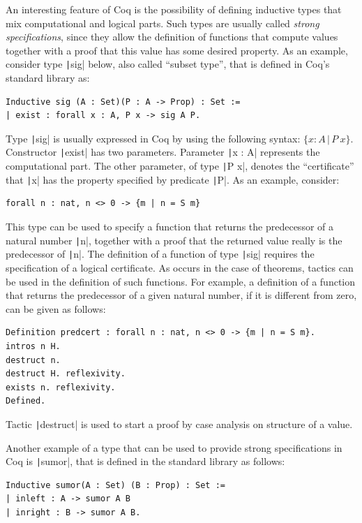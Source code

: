 \documentclass[oneside,12pt]{scrbook}
\theoremstyle{definition}
\newcommand{\coq}[1]{\texttt|#1|}
\theoremstyle{plain}
\theoremstyle{definition}
\begin{document}
An interesting feature of Coq is the possibility of defining inductive
types that mix computational and logical parts. Such types are usually
called \emph{strong specifications}, since they allow the definition
of functions that compute values together with a proof that this value
has some desired property. As an example, consider type \coq{sig}
below, also called ``subset type'', that is defined in Coq's standard
library as:
\begin{verbatim}
Inductive sig (A : Set)(P : A -> Prop) : Set :=
| exist : forall x : A, P x -> sig A P.
\end{verbatim}

Type \coq{sig} is usually expressed in Coq by using the following
syntax: $\{x : A \,\vert\,P\:x\}$.
Constructor \coq{exist} has two
parameters. Parameter \coq{x : A} represents the
computational part. The other parameter, of type \coq{P x}, denotes
the ``certificate'' that \coq{x} has the property specified by
predicate \coq{P}. As an example, consider:
\begin{verbatim}
forall n : nat, n <> 0 -> {m | n = S m}
\end{verbatim}
This type can be used to specify a function that returns the
predecessor of a natural number \coq{n}, together with a proof that
the returned value really is the predecessor of \coq{n}. The
definition of a function of type \coq{sig} requires the specification
of a logical certificate. As occurs in the case of theorems, tactics
can be used in the definition of such functions. For example, a
definition of a function that returns the predecessor of a given
natural number, if it is different from zero, can be given as follows:

\begin{verbatim}
Definition predcert : forall n : nat, n <> 0 -> {m | n = S m}.
intros n H.
destruct n.
destruct H. reflexivity.
exists n. reflexivity.
Defined.
\end{verbatim}

Tactic \coq{destruct} is used to start a proof by case analysis on
structure of a value.

Another example of a type that can be used to provide strong
specifications in Coq is \coq{sumor}, that is defined in the
standard library as follows:
\begin{verbatim}
Inductive sumor(A : Set) (B : Prop) : Set :=
| inleft : A -> sumor A B
| inright : B -> sumor A B.
\end{verbatim}
\end{document}
